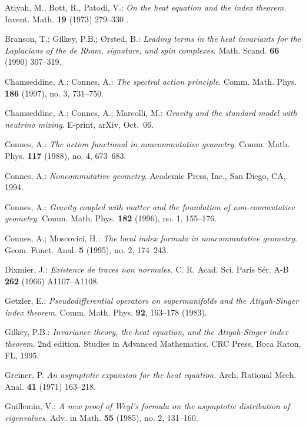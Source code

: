 \documentclass[leqno, 10pt]{amsart}
\theoremstyle{remark}
\begin{document}
\begin{thebibliography}{CCM}  
  Atiyah, M., Bott, R., Patodi, V.: \emph{On the heat equation and the index theorem.} Invent. Math. \textbf{19} (1973) 279--330 . 
  
  Branson, T.; Gilkey, P.B.; {\O}rsted, B.: \emph{Leading terms in the heat invariants for the Laplacians of the de Rham, 
 signature, and spin complexes}.  Math. Scand. \textbf{66} (1990) 307--319. 
  
    Chamseddine, A.; Connes, A.: \emph{The spectral action principle}. Comm. Math. Phys. \textbf{186} (1997), no. 3, 731--750. 
 
    Chamseddine, A.; Connes, A.; Marcolli, M.: \emph{Gravity and the standard model with neutrino mixing}. E-print, arXiv, Oct.~06.
 
 Connes, A.: \emph{The action functional in noncommutative geometry}. 
 Comm. Math. Phys. \textbf{117} (1988), no. 4, 673--683.
 
  Connes, A.: \emph{Noncommutative geometry}. 
 Academic Press, Inc., San Diego, CA, 1994.

    Connes, A.: \emph{Gravity coupled with matter and the foundation of non-commutative geometry}. 
  Comm. Math. Phys. \textbf{182} (1996), no. 1, 155--176.
 
  Connes, A.; Moscovici, H.: \emph{The local index formula in noncommutative geometry}. 
  Geom. Funct. Anal. \textbf{5} (1995), no. 2, 174--243.
 
 Dixmier, J.: \emph{Existence de traces non normales.} 
 C. R. Acad. Sci. Paris S\'er. A-B \textbf{262} (1966) A1107--A1108.
 
 Getzler, E.: \emph{Pseudodifferential operators on supermanifolds and 
the Atiyah-Singer index theorem}. Comm. Math. Phys. \textbf{92},  163--178 (1983). 

 Gilkey, P.B.: \emph{Invariance theory, the heat equation, and the Atiyah-Singer index theorem}. 
2nd edition. Studies in Advanced Mathematics. CRC Press, Boca Raton, FL, 1995. 
  
  Greiner, P. \emph{An asymptotic expansion for the heat equation}. Arch. Rational Mech. Anal. 
 \textbf{41} (1971) 163--218.    
 
 Guillemin, V.: \emph{A new proof of Weyl's formula on the asymptotic distribution of eigenvalues}. 
 Adv. in Math. \textbf{55} (1985), no. 2, 131--160. 
 

\end{thebibliography}
\end{document}
